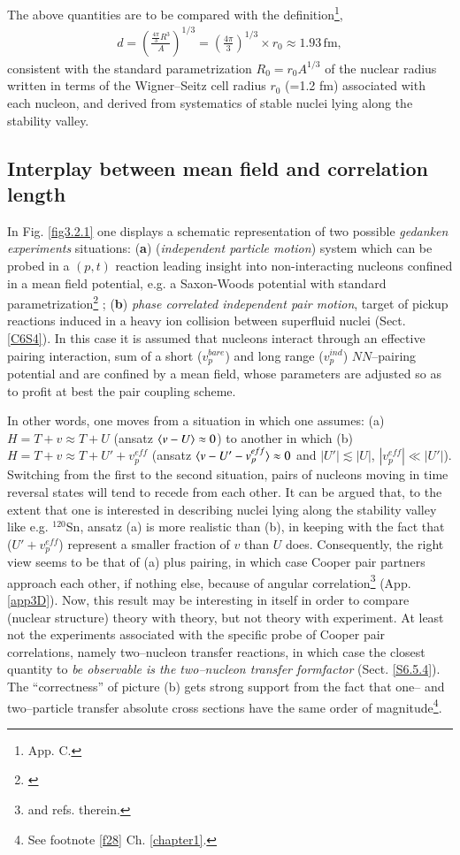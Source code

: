 The above quantities are to be compared with the definition\footnote{\cite{Brink:05} App. C.},
\begin{align}\label{eq3.2.27}
d=\left(\frac{\frac{4\pi}{3}R^3}{A}\right)^{1/3}=\left(\frac{4\pi}{3}\right)^{1/3}\times r_0\approx 1.93\, \text{fm},
\end{align} 
consistent with the standard parametrization $R_0=r_0A^{1/3}$ of the nuclear radius written in terms of the Wigner--Seitz cell radius $r_0$ (=1.2 fm)  associated with each nucleon, and derived from systematics of stable nuclei lying along the stability valley.
\subsection{Interplay between mean field and correlation length}\label{S4.3.1}
In Fig. \ref{fig3.2.1} one displays a schematic representation of two possible \textit{gedanken experiments} situations: (\textbf{a}) (\textit{independent particle motion}) system which can be probed in a $(p,t)$ reaction leading insight into  non-interacting nucleons confined in a mean field potential, e.g. a Saxon-Woods potential with standard parametrization\footnote{\cite{Bohr:69}} ; (\textbf{b}) \textit{phase correlated independent pair motion}, target of pickup reactions induced in a heavy ion collision between superfluid nuclei (Sect. \ref{C6S4}). In this case it is assumed that nucleons interact through an effective pairing interaction, sum of a short ($v_p^{bare}$) and long range ($v_p^{ind}$) $NN$--pairing potential and are confined by a mean field, whose parameters are  adjusted so as to profit at best the pair coupling scheme.


In other words, one moves from a situation in which one assumes: (a)$H=T+v\approx T+U$ (ansatz $\langle {v-U} \rangle\approx 0$) to another in which (b) $H=T+v\approx T+U'+v_p^{eff}$ (ansatz $\langle {v-U'-v_p^{eff}} \rangle\approx 0$ and $|U'|\lesssim|U|$, $|v_p^{eff}|\ll|U'|$). Switching from the first to the second situation, pairs of nucleons moving in time reversal states will tend to recede from each other. It can be argued that, to the extent that one is interested in describing  nuclei lying along the stability valley like e.g. $^{120}$Sn, ansatz (a) is more realistic  than (b), in keeping with the fact that ($U'+v_p^{eff}$) represent a smaller fraction of $v$ than $U$ does. Consequently, the right view seems to be that of (a) plus pairing, in which case Cooper pair partners approach each other, if nothing else, because of angular correlation\footnote{\cite{Bertsch:67,Ferreira:84,Matsuo:13} and refs. therein.} (App. \ref{app3D}). Now, this result may be interesting in itself in order  to compare (nuclear structure) theory with theory, but not theory with experiment. At least not the experiments associated with the specific probe of Cooper pair correlations, namely two--nucleon transfer reactions, in which case the closest quantity to \textit{be observable is the two--nucleon transfer formfactor} (Sect. \ref{S6.5.4}).
 The ``correctness'' of picture (b) gets strong support from  the fact that one-- and two--particle transfer  absolute cross sections have the same order of magnitude\footnote{\label{f24} See footnote \ref{f28} Ch. \ref{chapter1}.}. 


